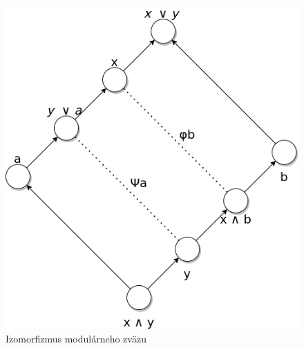 \documentclass[a4paper,10pt,oneside]{report}%
\begin{document}
\begin{figure}[!ht]
    \centering
    \includegraphics[scale=0.35]{modular_lattice_isomorphism.png}
    \caption{Izomorfizmus modulárneho zväzu}
\end{figure}
\end{document}
